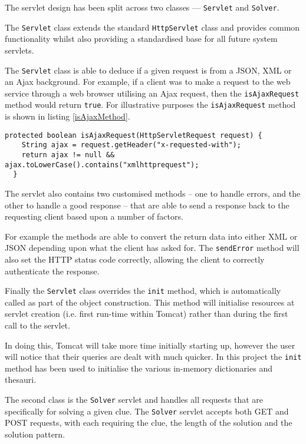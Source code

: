 The servlet design has been split across two classes --- \texttt{Servlet} and 
\texttt{Solver}.

The \texttt{Servlet} class extends the standard \texttt{HttpServlet} class and
provides common functionality whilst also providing a standardised base for all 
future system servlets.

The \texttt{Servlet} class is able to deduce if a given request is from a JSON,
XML or an Ajax background. For example, if a client was to make a request to the
web  service through a web browser utilising an Ajax request, then the 
\texttt{isAjaxRequest} method would return \texttt{true}. For illustrative 
purposes the \texttt{isAjaxRequest} method is shown in listing 
\ref{isAjaxMethod}.

\begin{lstlisting}[caption={isAjaxMethod deduces if a request was made by AJAX},
                   label=isAjaxMethod]  
  protected boolean isAjaxRequest(HttpServletRequest request) {
    String ajax = request.getHeader("x-requested-with");
    return ajax != null && ajax.toLowerCase().contains("xmlhttprequest");
  }
\end{lstlisting}

The servlet also contains two customised methods -- one to handle errors, and 
the other to handle a good response -- that are able to send a response back to 
the requesting client based upon a number of factors.

For example the methods are able to convert the return data into either XML or 
JSON depending upon what the client has asked for. The \texttt{sendError} method
will also set the HTTP status code correctly, allowing the client to correctly 
authenticate the response.

Finally the \texttt{Servlet} class overrides the \texttt{init} method, which 
is automatically called as part of the object construction. This method will 
initialise resources at servlet creation (i.e. first run-time within Tomcat) 
rather than during the first call to the servlet. 

In doing this, Tomcat will take more time initially starting up, however the 
user will notice that their queries are dealt with much quicker. In this project
the \texttt{init} method has been used to initialise the various in-memory 
dictionaries and thesauri.

The second class is the \texttt{Solver} servlet and handles all requests that are
specifically for solving a given clue. The \texttt{Solver} servlet accepts both
GET and POST requests, with each requiring the clue, the length of the solution
and the solution pattern.

